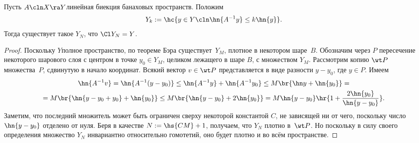 \documentclass[a4paper]{article}
\begin{document}
\begin{lemma}
Пусть $A\cln X \ra Y$\т линейная биекция банаховых пространств.
Положим
$$Y_k := \hc{y \in Y\cln \hn{A^{-1}y} \le k\hn{y}}.$$
Тогда существует такое $Y_N$, что $\Cl Y_N = Y$.
\end{lemma}
\begin{proof}
Поскольку $Y$\т полное пространство, по теореме Бэра существует~$Y_M$, плотное в некотором шаре~$B$.
Обозначим через $P$ пересечение некоторого шарового слоя с центром в точке $y_0 \in Y_M$, целиком лежащего
в шаре $B$, с множеством $Y_M$. Рассмотрим копию $\wt P$ множества~$P$, сдвинутую в начало координат.
Всякий вектор $v \in \wt P$ представляется в виде разности $y - y_0$, где $y \in P$.
Имеем
\begin{multline*}
\hn{A^{-1}v} = \hn{A^{-1}(y-y_0)} \le \hn{A^{-1}y} + \hn{A^{-1}y_0} \le M\br{\hn y + \hn{y_0}} =\\=
M\br{\hn{y - y_0 + y_0} + \hn{y_0} } \le M\br{\hn{y -y_0} + 2\hn{y_0}} = M\hn{y-y_0}\hr{1 + \frac{2\hn{y_0}}{\hn{y-y_0}}}.
\end{multline*}
Заметим, что последний множитель может быть ограничен сверху некоторой константой $C$,
не зависящей ни от чего, поскольку число $\hn{y-y_0}$ отделено от нуля. Беря
в качестве $N := \hs{CM} + 1$, получаем, что $Y_N$ плотно в~$\wt P$. Но поскольку
в силу своего определения множество $Y_N$ инвариантно относительно
гомотетий, оно будет плотно и во всём пространстве.
\end{proof}
\end{document}
